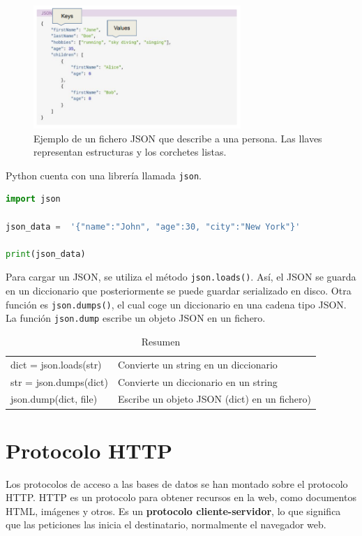 \begin{figure}[htbp]
\centering
\includegraphics[width = 0.7\textwidth]{figs/json.png}
\caption{Ejemplo de un fichero JSON que describe a una persona. Las llaves representan estructuras y los corchetes listas.}
\label{fig:json}
\end{figure}

Python cuenta con una librería llamada \texttt{json}.
\begin{lstlisting}[language=Python]
import json

json_data =  '{"name":"John", "age":30, "city":"New York"}'

print(json_data)
\end{lstlisting}

Para cargar un JSON, se utiliza el método \texttt{json.loads()}. Así, el JSON se guarda en un diccionario que posteriormente se puede guardar serializado en disco. Otra función es \texttt{json.dumps()}, el cual coge un diccionario en una cadena tipo JSON. La función \texttt{json.dump} escribe un objeto JSON en un fichero. 

\begin{table}[htbp]
\centering
\begin{tabular}{l | l}
dict = json.loads(str) & Convierte un string en un diccionario \\
str = json.dumps(dict) & Convierte un diccionario en un string \\
json.dump(dict, file) & Escribe un objeto JSON (dict) en un fichero)
\end{tabular}
\caption{Resumen}
\end{table}

\section{Protocolo HTTP}
Los protocolos de acceso a las bases de datos se han montado sobre el protocolo HTTP. HTTP es un protocolo para obtener recursos en la web, como documentos HTML, imágenes y otros. Es un \textbf{protocolo cliente-servidor}, lo que significa que las peticiones las inicia el destinatario, normalmente el navegador web. 

